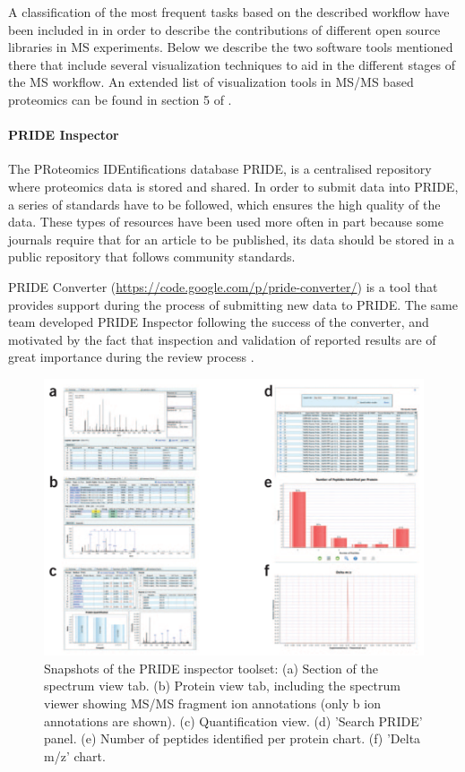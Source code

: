 A classification of the most frequent tasks based on the described workflow have been included in \cite{PER2014} in order to describe the contributions of different open source libraries in MS experiments. Below we describe the two software tools mentioned there that include several visualization techniques to aid in the different stages of the MS workflow. An extended list of visualization tools in MS/MS based proteomics can be found in section 5 of \cite{JAC2010}.

\paragraph{PRIDE Inspector}
The PRoteomics IDEntifications database PRIDE, is a centralised repository where proteomics data is stored and shared. In order to submit data into PRIDE, a series of standards have to be followed, which ensures the high quality of the data. These types of resources have been used more often in part because some journals require that for an article to be published, its data should be stored in a public repository that follows community standards.

PRIDE Converter (\url{https://code.google.com/p/pride-converter/}) is a tool that provides support during the process of submitting new data to PRIDE. The same team developed PRIDE Inspector following the success of the converter, and motivated by the fact that inspection and validation of reported results are of great importance during the review process \cite{WAN2012}.

\begin{figure}  
\centering
\includegraphics[width=\textwidth]{figures/prideinspector.png}
\caption[Snapshots of the PRIDE inspector toolset.]{Snapshots of the PRIDE inspector toolset: (a) Section of the spectrum view tab. (b) Protein view tab, including the spectrum viewer showing MS/MS fragment ion annotations (only b ion annotations are shown). (c) Quantification view. (d) 'Search PRIDE' panel. (e) Number of peptides identified per protein chart. (f) 'Delta m/z' chart.
\label{fig:pride}}
\end{figure}

